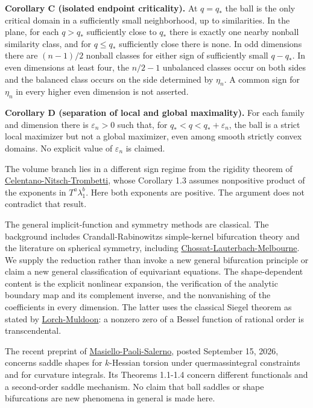 \documentclass[11pt]{article}
\begin{document}
\textbf{Corollary C (isolated endpoint criticality).} At \(q=q_*\) the
ball is the only critical domain in a sufficiently small neighborhood,
up to similarities. In the plane, for each \(q>q_*\) sufficiently close
to \(q_*\) there is exactly one nearby nonball similarity class, and for
\(q\le q_*\) sufficiently close there is none. In odd dimensions there
are \((n-1)/2\) nonball classes for either sign of sufficiently small
\(q-q_*\). In even dimensions at least four, the \(n/2-1\) unbalanced
classes occur on both sides and the balanced class occurs on the side
determined by \(\eta_n\). A common sign for \(\eta_n\) in every higher
even dimension is not asserted.

\textbf{Corollary D (separation of local and global maximality).} For
each family and dimension there is \(\varepsilon_n>0\) such that, for
\(q_*<q<q_*+\varepsilon_n\), the ball is a strict local maximizer but
not a global maximizer, even among smooth strictly convex domains. No
explicit value of \(\varepsilon_n\) is claimed.

The volume branch lies in a different sign regime from the rigidity
theorem of
\href{https://doi.org/10.1007/s00032-024-00405-9}{Celentano-Nitsch-Trombetti},
whose Corollary 1.3 assumes nonpositive product of the exponents in
\(T^a\lambda_1^b\). Here both exponents are positive. The argument does
not contradict that result.

The general implicit-function and symmetry methods are classical. The
background includes Crandall-Rabinowitz\textquotesingle s simple-kernel
bifurcation theory and the literature on spherical symmetry, including
\href{https://doi.org/10.1007/BF00374697}{Chossat-Lauterbach-Melbourne}.
We supply the reduction rather than invoke a new general bifurcation
principle or claim a new general classification of equivariant
equations. The shape-dependent content is the explicit nonlinear
expansion, the verification of the analytic boundary map and its
complement inverse, and the nonvanishing of the coefficients in every
dimension. The latter uses the classical Siegel theorem as stated by
\href{https://doi.org/10.1155/S0161171295000706}{Lorch-Muldoon}: a
nonzero zero of a Bessel function of rational order is transcendental.

The recent preprint of
\href{https://arxiv.org/abs/2609.17083}{Masiello-Paoli-Salerno}, posted
September 15, 2026, concerns saddle shapes for \(k\)-Hessian torsion
under quermassintegral constraints and for curvature integrals. Its
Theorems 1.1-1.4 concern different functionals and a second-order saddle
mechanism. No claim that ball saddles or shape bifurcations are new
phenomena in general is made here.
\end{document}
